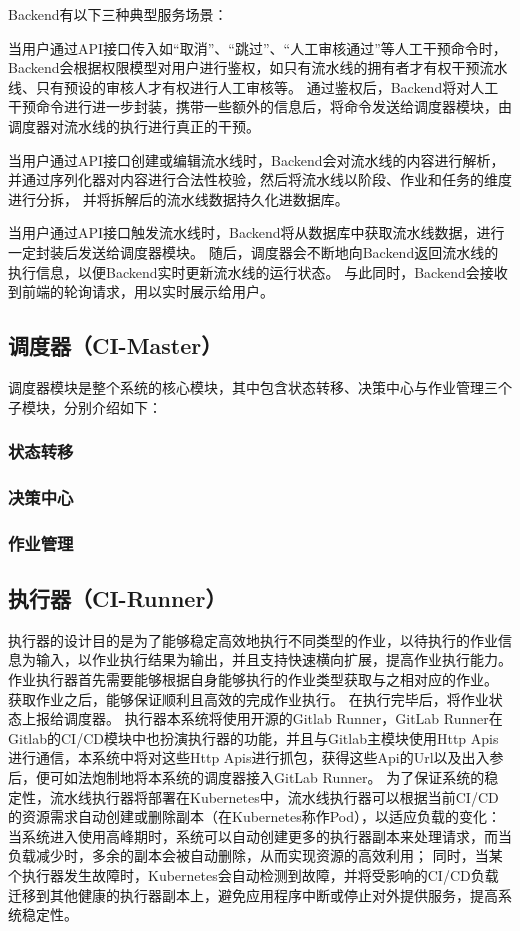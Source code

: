 Backend有以下三种典型服务场景：

当用户通过API接口传入如“取消”、“跳过”、“人工审核通过”等人工干预命令时，Backend会根据权限模型对用户进行鉴权，如只有流水线的拥有者才有权干预流水线、只有预设的审核人才有权进行人工审核等。
通过鉴权后，Backend将对人工干预命令进行进一步封装，携带一些额外的信息后，将命令发送给调度器模块，由调度器对流水线的执行进行真正的干预。

当用户通过API接口创建或编辑流水线时，Backend会对流水线的内容进行解析，并通过序列化器对内容进行合法性校验，然后将流水线以阶段、作业和任务的维度进行分拆，
并将拆解后的流水线数据持久化进数据库。

当用户通过API接口触发流水线时，Backend将从数据库中获取流水线数据，进行一定封装后发送给调度器模块。
随后，调度器会不断地向Backend返回流水线的执行信息，以便Backend实时更新流水线的运行状态。
与此同时，Backend会接收到前端的轮询请求，用以实时展示给用户。


\subsection{调度器（CI-Master）}

调度器模块是整个系统的核心模块，其中包含状态转移、决策中心与作业管理三个子模块，分别介绍如下：

\subsubsection{状态转移}



\subsubsection{决策中心}

\subsubsection{作业管理}



\subsection{执行器（CI-Runner）}

执行器的设计目的是为了能够稳定高效地执行不同类型的作业，以待执行的作业信息为输入，以作业执行结果为输出，并且支持快速横向扩展，提高作业执行能力。
作业执行器首先需要能够根据自身能够执行的作业类型获取与之相对应的作业。
获取作业之后，能够保证顺利且高效的完成作业执行。
在执行完毕后，将作业状态上报给调度器。
执行器本系统将使用开源的Gitlab Runner，GitLab Runner在Gitlab的CI/CD模块中也扮演执行器的功能，并且与Gitlab主模块使用Http Apis进行通信，本系统中将对这些Http Apis进行抓包，获得这些Api的Url以及出入参后，便可如法炮制地将本系统的调度器接入GitLab Runner。
为了保证系统的稳定性，流水线执行器将部署在Kubernetes中，流水线执行器可以根据当前CI/CD的资源需求自动创建或删除副本（在Kubernetes称作Pod），以适应负载的变化：当系统进入使用高峰期时，系统可以自动创建更多的执行器副本来处理请求，而当负载减少时，多余的副本会被自动删除，从而实现资源的高效利用；
同时，当某个执行器发生故障时，Kubernetes会自动检测到故障，并将受影响的CI/CD负载迁移到其他健康的执行器副本上，避免应用程序中断或停止对外提供服务，提高系统稳定性。


